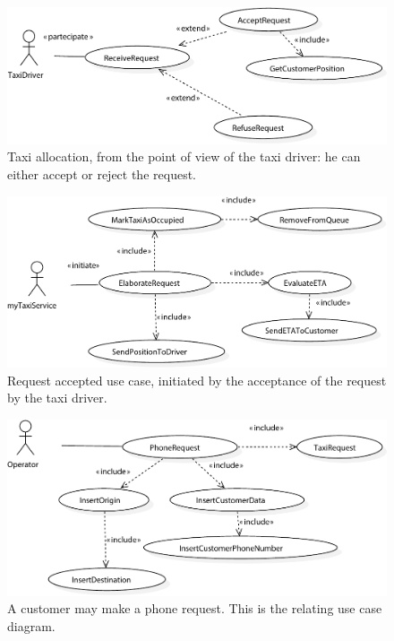 \begin{figure}
	\includegraphics[width=\linewidth]{img/U_DriverRequestEvaluation.pdf}
	\caption{Taxi allocation, from the point of view of the taxi driver: he can either accept or reject the request.}
\end{figure}


\begin{figure}[!h]
	\includegraphics[width=\linewidth]{img/U_RequestAccepted}
	\caption{Request accepted use case, initiated by the acceptance of the request by the taxi driver.}
\end{figure}	


\begin{figure}
	\includegraphics[width=\linewidth]{img/U_PhoneRequest}
	\caption{A customer may make a phone request. This is the relating use case diagram.}
\end{figure}	


